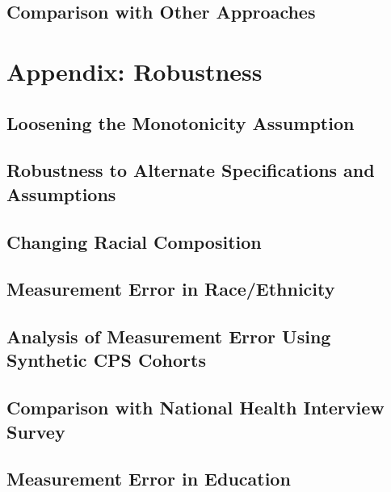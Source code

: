 \documentclass[12pt,letterpaper]{article}
\numberwithin{equation}{section}
\begin{document}
\begin{appendix}
\subsection{Comparison with Other Approaches} 
\label{sec:app_comparison} 
\normalsize 

\newpage 
\clearpage 

\renewcommand{\thetable}{D\arabic{table}}
\renewcommand{\thefigure}{D\arabic{figure}}
\setcounter{table}{0}
\setcounter{figure}{0}

\section{Appendix: Robustness}
\label{sec:app_robust}

\subsection{Loosening the Monotonicity Assumption}
\label{sec:app_nonmon}
\normalsize 

\subsection{Robustness to Alternate Specifications and Assumptions}
\label{sec:app_assumptions}
\normalsize 

\clearpage
\subsection{Changing Racial Composition} 
\label{sec:app_race_distrib} 
\normalsize 

\clearpage
\subsection{Measurement Error in Race/Ethnicity} 
\label{sec:app_hisp}
\normalsize 

\clearpage
\subsection{Analysis of Measurement Error Using Synthetic CPS Cohorts}
\label{sec:app_cps_cohorts}
\normalsize 

\clearpage
\subsection{Comparison with National Health Interview Survey}
\label{sec:app_nhis}
\normalsize 

\clearpage
\subsection{Measurement Error in Education} 
\label{sec:app_ed_error} 
\normalsize 

\end{appendix}
\end{document}
